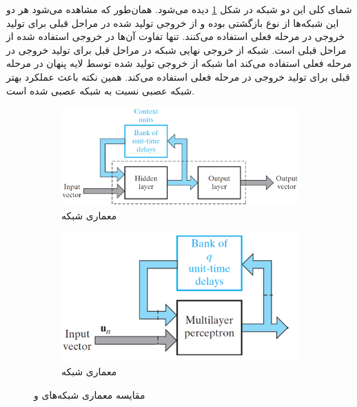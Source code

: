 \documentclass[12pt, a4paper]{article}
\begin{document}
شمای کلی این دو شبکه در شکل \ref{comparison_of_elman_jordan} دیده می‌شود.
همان‌طور که مشاهده می‌شود هر دو این شبکه‌ها از نوع بازگشتی بوده و
از خروجی تولید شده در مراحل قبلی برای تولید خروجی در مرحله فعلی استفاده می‌کنند. تنها تفاوت آن‌ها در خروجی استفاده شده از
مراحل قبلی است. شبکه  از خروجی نهایی شبکه در مراحل قبل برای تولید خروجی در مرحله فعلی استفاده می‌کند اما
شبکه  از خروجی تولید شده توسط لایه پنهان در مرحله قبلی برای تولید خروجی در مرحله فعلی استفاده می‌کند. همین
نکته باعث عملکرد بهتر شبکه عصبی  نسبت به شبکه عصبی  شده است.

\begin{figure}[h]
    \begin{subfigure}{0.5\linewidth}
        \centering
        \includegraphics[scale=0.18]{images/q1/elman/schema.png}
        \caption{معماری شبکه }
    \end{subfigure}
    \hfill
    \begin{subfigure}{0.5\linewidth}
        \centering
        \includegraphics[scale=0.3]{images/q1/jordan/schema.png}
        \caption{معماری شبکه }
    \end{subfigure}
    \caption{مقایسه معماری شبکه‌های  و }
    \label{comparison_of_elman_jordan}
\end{figure}
\end{document}
